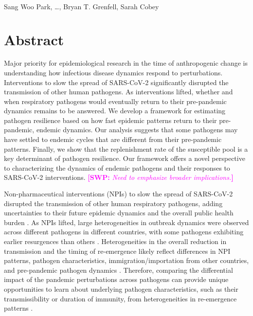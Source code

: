 \documentclass[12pt]{article}
\date{\today}
\newcommand{\comment}{\showcomment}
\newcommand{\showcomment}[3]{\textcolor{#1}{\textbf{[#2: }\textsl{#3}\textbf{]}}}
\newcommand{\swp}[1]{\comment{magenta}{SWP}{#1}}
\begin{document}
\begin{flushleft}{
	\Large
	\textbf{}
}
\newline
\\
Sang Woo Park, \dots, Bryan T. Grenfell, Sarah Cobey
\\
\bigskip
\end{flushleft}

\section*{Abstract}

Major priority for epidemiological research in the time of anthropogenic change is understanding how infectious disease dynamics respond to perturbations.
Interventions to slow the spread of SARS-CoV-2 significantly disrupted the transmission of other human pathogens. 
As interventions lifted, whether and when respiratory pathogens would eventually return to their pre-pandemic dynamics remains to be answered. 
We develop a framework for estimating pathogen resilience based on how fast epidemic patterns return to their pre-pandemic, endemic dynamics.
Our analysis suggests that some pathogens may have settled to endemic cycles that are different from their pre-pandemic patterns.
Finally, we show that the replenishment rate of the susceptible pool is a key determinant of pathogen resilience.
Our framework offers a novel perspective to characterizing the dynamics of endemic pathogens and their responses to SARS-CoV-2 interventions.
\swp{Need to emphasize broader implications.}

\pagebreak

Non-pharmaceutical interventions (NPIs) to slow the spread of SARS-CoV-2 disrupted the transmission of other human respiratory pathogens, adding uncertainties to their future epidemic dynamics and the overall public health burden \citep{baker2020impact}.
As NPIs lifted, large heterogeneities in outbreak dynamics were observed across different pathogens in different countries, with some pathogens exhibiting earlier resurgences than others \citep{gomez2021uncertain,koltai2022determinants,park2024predicting}.
Heterogeneities in the overall reduction in transmission and the timing of re-emergence likely reflect differences in NPI patterns, pathogen characteristics, immigration/importation from other countries, and pre-pandemic pathogen dynamics \citep{perofsky2024impacts}.
Therefore, comparing the differential impact of the pandemic perturbations across pathogens can provide unique opportunities to learn about underlying pathogen characteristics, such as their transmissibility or duration of immunity, from heterogeneities in re-emergence patterns \citep{chow2023effects}.
\end{document}
